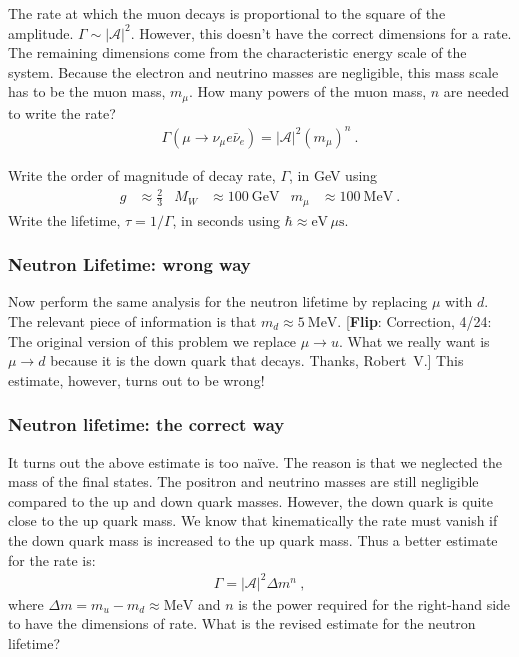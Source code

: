 \documentclass[12pt]{article}
\newcommand{\flip}[1]{{\color{red} [\textbf{Flip}: {#1}]}}
\begin{document}
The rate at which the muon decays is proportional to the square of the amplitude. $\Gamma \sim |\mathcal A|^2$. However, this doesn't have the correct dimensions for a rate. The remaining dimensions come from the characteristic energy scale of the system. Because the electron and neutrino masses are negligible, this mass scale has to be the muon mass, $m_\mu$. How many powers of the muon mass, $n$ are needed to write the rate?
\begin{align}
	\Gamma(\mu\to \nu_\mu e\bar\nu_e) = |\mathcal A|^2 (m_\mu)^n \ .
\end{align}

Write the order of magnitude of decay rate, $\Gamma$, in GeV using
\begin{align}
	g&\approx \frac{2}{3}
	&
	M_W &\approx 100~\text{GeV}
	&
	m_\mu &\approx 100~\text{MeV} \ .
\end{align}
Write the lifetime, $\tau = 1/\Gamma$, in seconds using $\hbar \approx \text{eV} \, \mu\text{s}$.




\subsubsection{Neutron Lifetime: wrong way}


Now perform the same analysis for the neutron lifetime by replacing $\mu$ with $d$. The relevant piece of information is that $m_d \approx 5~\text{MeV}$. \flip{Correction, 4/24: The original version of this problem we replace $\mu\to u$. What we really want is $\mu\to d$ because it is the down quark that decays. Thanks, Robert~V.} This estimate, however, turns out to be wrong!

\subsubsection{Neutron lifetime: the correct way}

It turns out the above estimate is too na\"ive. The reason is that we neglected the mass of the final states. The positron and neutrino masses are still negligible compared to the up and down quark masses. However, the down quark is quite close to the up quark mass. We know that kinematically the rate must vanish if the down quark mass is increased to the up quark mass. Thus a better estimate for the rate is:
\begin{align}
	\Gamma = |\mathcal A|^2 \Delta m^n \ ,
\end{align}
where $\Delta m = m_u - m_d \approx \text{MeV}$ and $n$ is the power required for the right-hand side to have the dimensions of rate. What is the revised estimate for the neutron lifetime? 
\end{document}
